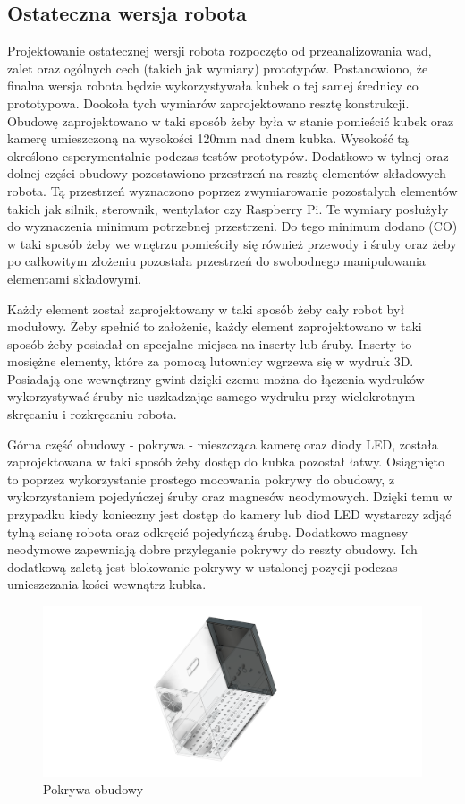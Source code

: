 \subsection{Ostateczna wersja robota}
Projektowanie ostatecznej wersji robota rozpoczęto od przeanalizowania wad, zalet oraz ogólnych cech (takich jak wymiary) prototypów.
Postanowiono, że finalna wersja robota będzie wykorzystywała kubek o tej samej średnicy co prototypowa. Dookoła tych wymiarów zaprojektowano 
resztę konstrukcji. Obudowę zaprojektowano w taki sposób żeby była w stanie pomieścić
kubek oraz kamerę umieszczoną na wysokości 120mm nad dnem kubka. Wysokość tą określono esperymentalnie podczas testów prototypów.
Dodatkowo w tylnej oraz dolnej części obudowy pozostawiono przestrzeń na resztę
elementów składowych robota. Tą przestrzeń wyznaczono poprzez zwymiarowanie pozostałych elementów takich jak silnik, sterownik, wentylator 
czy Raspberry Pi. Te wymiary posłużyły do wyznaczenia minimum potrzebnej przestrzeni. Do tego minimum dodano (CO) w taki sposób
żeby we wnętrzu pomieściły się również przewody i śruby oraz żeby po całkowitym złożeniu pozostała przestrzeń do swobodnego manipulowania
elementami składowymi.

Każdy element został zaprojektowany w taki sposób żeby cały robot był modułowy. Żeby spełnić to założenie, każdy element
zaprojektowano w taki sposób żeby posiadał on specjalne miejsca na inserty lub śruby. Inserty to mosiężne elementy, które za pomocą lutownicy wgrzewa się
w wydruk 3D. Posiadają one wewnętrzny gwint dzięki czemu można do łączenia wydruków wykorzystywać śruby nie uszkadzając samego wydruku przy 
wielokrotnym skręcaniu i rozkręcaniu robota.

Górna część obudowy - pokrywa - mieszcząca kamerę oraz diody LED, została zaprojektowana w taki sposób żeby dostęp do kubka pozostał łatwy. Osiągnięto to
poprzez wykorzystanie prostego mocowania pokrywy do obudowy, z wykorzystaniem pojedyńczej śruby oraz magnesów neodymowych. Dzięki temu w przypadku kiedy konieczny 
jest dostęp do kamery lub diod LED wystarczy zdjąć tylną scianę robota oraz odkręcić pojedyńczą śrubę. Dodatkowo magnesy neodymowe zapewniają
dobre przyleganie pokrywy do reszty obudowy. Ich dodatkową zaletą jest blokowanie pokrywy w ustalonej pozycji podczas umieszczania kości wewnątrz
kubka.

\begin{figure}[H]
    \centering
    \includegraphics[width=0.95\linewidth]{chapters/03-praca-wlasna/figures/pokrywa.png}
    \caption{\label{fig:pokrywa}Pokrywa obudowy}
\end{figure}

